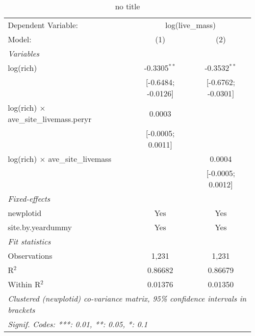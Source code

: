 
\begin{table}[htbp]
   \caption{no title}
   \centering
   \begin{tabular}{lcc}
      \tabularnewline \midrule \midrule
      Dependent Variable: & \multicolumn{2}{c}{log(live\_mass)}\\
      Model:                                          & (1)                & (2)\\  
      \midrule
      \emph{Variables}\\
      log(rich)                                       & -0.3305$^{**}$     & -0.3532$^{**}$\\   
                                                      & [-0.6484; -0.0126] & [-0.6762; -0.0301]\\   
      log(rich) $\times$ ave\_site\_livemass.peryr    & 0.0003             &   \\   
                                                      & [-0.0005; 0.0011]  &   \\   
      log(rich) $\times$ ave\_site\_livemass          &                    & 0.0004\\   
                                                      &                    & [-0.0005; 0.0012]\\   
      \midrule
      \emph{Fixed-effects}\\
      newplotid                                       & Yes                & Yes\\  
      site.by.yeardummy                               & Yes                & Yes\\  
      \midrule
      \emph{Fit statistics}\\
      Observations                                    & 1,231              & 1,231\\  
      R$^2$                                           & 0.86682            & 0.86679\\  
      Within R$^2$                                    & 0.01376            & 0.01350\\  
      \midrule \midrule
      \multicolumn{3}{l}{\emph{Clustered (newplotid) co-variance matrix, 95\% confidence intervals in brackets}}\\
      \multicolumn{3}{l}{\emph{Signif. Codes: ***: 0.01, **: 0.05, *: 0.1}}\\
   \end{tabular}
\end{table}


